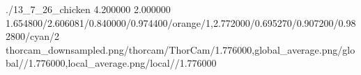 \TrioComparisonFigure
    {./13_7_26_chicken}
    {4.200000}
    {2.000000}
    {1.654800/2.606081/0.840000/0.974400/orange/1,2.772000/0.695270/0.907200/0.982800/cyan/2}
    {thorcam_downsampled.png/thorcam/ThorCam/1.776000,global_average.png/global//1.776000,local_average.png/local//1.776000}

